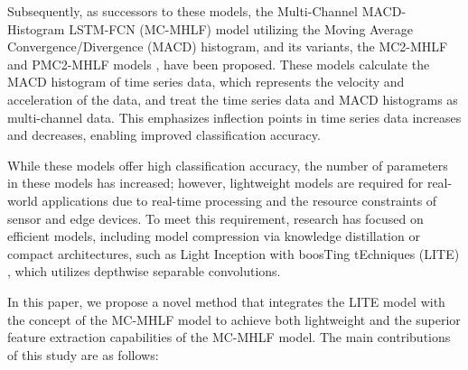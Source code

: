 \documentclass[conference]{IEEEtran}
\begin{document}
Subsequently, as successors to these models, the Multi-Channel MACD-Histogram LSTM-FCN (MC-MHLF) model utilizing the Moving Average Convergence/Divergence (MACD) histogram\cite{murphy1999technical}, and its variants, the MC2-MHLF and PMC2-MHLF models \cite{10335821}, have been proposed. These models calculate the MACD histogram of time series data, which represents the velocity and acceleration of the data, and treat the time series data and MACD histograms as multi-channel data. This emphasizes inflection points in time series data increases and decreases, enabling improved classification accuracy.

While these models offer high classification accuracy, the number of parameters in these models has increased; however, lightweight models are required for real-world applications due to real-time processing and the resource constraints of sensor and edge devices. To meet this requirement, research has focused on efficient models, including model compression via knowledge distillation or compact architectures, such as Light Inception with boosTing tEchniques (LITE) \cite{Ismail-Fawaz2023LITELightInception,ismail2025look}, which utilizes depthwise separable convolutions.

In this paper, we propose a novel method that integrates the LITE model with the concept of the MC-MHLF model to achieve both lightweight and the superior feature extraction capabilities of the MC-MHLF model. The main contributions of this study are as follows:
\end{document}
